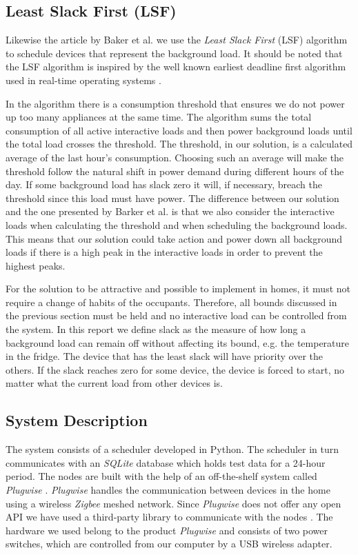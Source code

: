\subsection{Least Slack First (LSF)}

Likewise the article by Baker et al. we use the \emph{Least Slack First} (LSF) algorithm to schedule devices that represent the background load. It should be noted that the LSF algorithm is inspired by the well known earliest deadline first algorithm used in real-time operating systems \cite{barker2012smartcap}. 

In the algorithm there is a consumption threshold that ensures we do not power up too many appliances at the same time. The algorithm sums the total consumption of all active interactive loads and then power background loads until the total load crosses the threshold. The threshold, in our solution, is a calculated average of the last hour's consumption. Choosing such an average will make the threshold follow the natural shift in power demand during different hours of the day. If some background load has slack zero it will, if necessary, breach the threshold since this load must have power. The difference between our solution and the one presented by Barker et al. is that we also consider the interactive loads when calculating the threshold and when scheduling the background loads. This means that our solution could take action and power down all background loads if there is a high peak in the interactive loads in order to prevent the highest peaks. 

For the solution to be attractive and possible to implement in homes, it must not require a change of habits of the occupants. Therefore, all bounds discussed in the previous section must be held and no interactive load can be controlled from the system. In this report we define slack as the measure of how long a background load can remain off without affecting its bound, e.g. the temperature in the fridge. The device that has the least slack will have priority over the others. If the slack reaches zero for some device, the device is forced to start, no matter what the current load from other devices is.

\subsection{System Description}
The system consists of a scheduler developed in Python. The scheduler in turn communicates with an \emph{SQLite} database which holds test data for a 24-hour period. The nodes are built with the help of an off-the-shelf system called \emph{Plugwise} \cite{plugwise2014}. \emph{Plugwise} handles the communication between devices in the home using a wireless \emph{Zigbee} meshed network. Since \emph{Plugwise} does not offer any open API we have used a third-party library to communicate with the nodes \cite{hadaraplugwise}. The hardware we used belong to the product \emph{Plugwise} and consists of two power switches, which are controlled from our computer by a USB wireless adapter.

